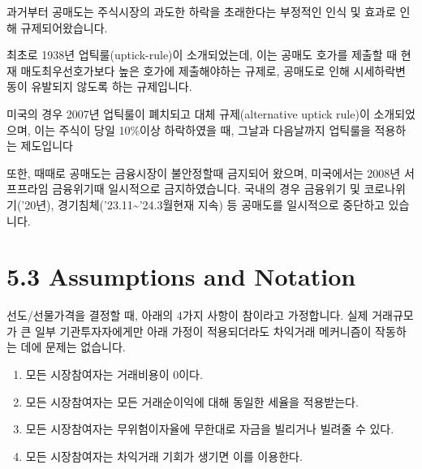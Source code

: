 \documentclass[
  letterpaper,
  DIV=11,
  numbers=noendperiod]{scrreprt}
\providecommand{\tightlist}{%
  \setlength{\itemsep}{0pt}\setlength{\parskip}{0pt}}\usepackage{longtable,booktabs,array}
\begin{document}
\begin{tcolorbox}[enhanced jigsaw, titlerule=0mm, bottomtitle=1mm, left=2mm, title=\textcolor{quarto-callout-note-color}{\faInfo}\hspace{0.5em}{공매도와 규제}, toptitle=1mm, bottomrule=.15mm, colframe=quarto-callout-note-color-frame, breakable, opacityback=0, rightrule=.15mm, opacitybacktitle=0.6, coltitle=black, colback=white, arc=.35mm, colbacktitle=quarto-callout-note-color!10!white, toprule=.15mm, leftrule=.75mm]

과거부터 공매도는 주식시장의 과도한 하락을 초래한다는 부정적인 인식 및
효과로 인해 규제되어왔습니다.

최초로 1938년 업틱룰(uptick-rule)이 소개되었는데, 이는 공매도 호가를
제출할 때 현재 매도최우선호가보다 높은 호가에 제출해야하는 규제로,
공매도로 인해 시세하락변동이 유발되지 않도록 하는 규제입니다.

미국의 경우 2007년 업틱룰이 폐치되고 대체 규제(alternative uptick
rule)이 소개되었으며, 이는 주식이 당일 10\%이상 하락하였을 때, 그날과
다음날까지 업틱룰을 적용하는 제도입니다

또한, 때때로 공매도는 금융시장이 불안정할때 금지되어 왔으며, 미국에서는
2008년 서프프라임 금융위기때 일시적으로 금지하였습니다. 국내의 경우
금융위기 및 코로나위기('20년), 경기침체('23.11\textasciitilde'24.3월현재
지속) 등 공매도를 일시적으로 중단하고 있습니다.

\end{tcolorbox}

\section*{5.3 Assumptions and Notation}\label{assumptions-and-notation}


선도/선물가격을 결정할 때, 아래의 4가지 사항이 참이라고 가정합니다. 실제
거래규모가 큰 일부 기관투자자에게만 아래 가정이 적용되더라도 차익거래
메커니즘이 작동하는 데에 문제는 없습니다.

\begin{enumerate}
\def\labelenumi{\arabic{enumi}.}
\tightlist
\item
  모든 시장참여자는 거래비용이 0이다.
\item
  모든 시장참여자는 모든 거래순이익에 대해 동일한 세율을 적용받는다.
\item
  모든 시장참여자는 무위험이자율에 무한대로 자금을 빌리거나 빌려줄 수
  있다.
\item
  모든 시장참여자는 차익거래 기회가 생기면 이를 이용한다.
\end{enumerate}
\end{document}
